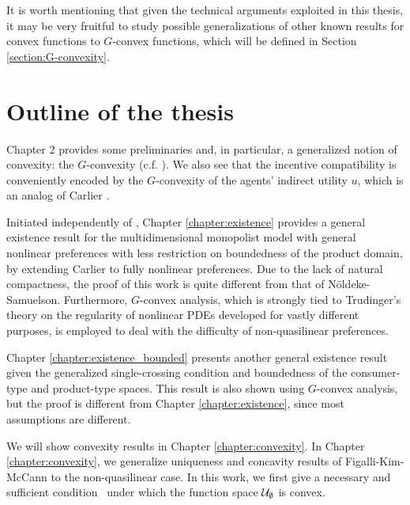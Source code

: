 It is worth mentioning that given the technical arguments exploited in this thesis, it may be very fruitful to study possible generalizations of other known results for convex functions to $G$-convex functions, which will be defined in Section \ref{section:G-convexity}.
\medskip


\section{Outline of the thesis}


	Chapter 2 provides some preliminaries and, in particular, a generalized notion of convexity: the $G$-convexity (c.f. \cite{Trudinger14,Balder77,Singer97}).
	We also see that the incentive compatibility is conveniently encoded by the  $G$-convexity
	of the agents' indirect utility $u$, which is an analog of Carlier \cite{Carlier01}.
	\medskip

	Initiated independently of \cite{NoldekeSamuelson15p}, Chapter \ref{chapter:existence}  provides a general existence result for the multidimensional monopolist model with general nonlinear preferences with less restriction on boundedness of the product domain, {by extending} %
	Carlier \cite{Carlier01} to fully nonlinear preferences. Due to the lack of natural compactness, the proof of this work is quite different from that of N\"oldeke-Samuelson. Furthermore, $G$-convex analysis, which is strongly tied to Trudinger's theory on the regularity of nonlinear PDEs \cite{Trudinger14}  developed for vastly different purposes, is employed to deal with the difficulty of non-quasilinear preferences.	
	\medskip



Chapter \ref{chapter:existence_bounded} presents another general existence result given the generalized single-crossing condition and boundedness of the consumer-type and product-type spaces. This result is also shown using $G$-convex analysis, but the proof is different from Chapter \ref{chapter:existence}, since most assumptions are different.\medskip


We will show convexity results in Chapter \ref{chapter:convexity}. In Chapter \ref{chapter:convexity}, we generalize uniqueness and concavity results of Figalli-Kim-McCann to the non-quasilinear case. In this work, we first give a necessary and sufficient condition \Gthree~under which the function space $\mathcal{U}_{\emptyset}$ is convex. \medskip


